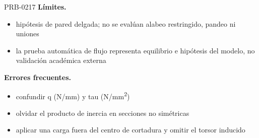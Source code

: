 \begin{studiumworked}{PRB-0217}
\textbf{Límites.}\begin{itemize}\item hipótesis de pared delgada; no se evalúan alabeo restringido, pandeo ni uniones
\item la prueba automática de flujo representa equilibrio e hipótesis del modelo, no validación académica externa\end{itemize}

\textbf{Errores frecuentes.}\begin{itemize}\item confundir q (N/mm) y tau (N/mm\textsuperscript{2})
\item olvidar el producto de inercia en secciones no simétricas
\item aplicar una carga fuera del centro de cortadura y omitir el torsor inducido\end{itemize}

\end{studiumworked}

\Needspace{.3\textheight}


